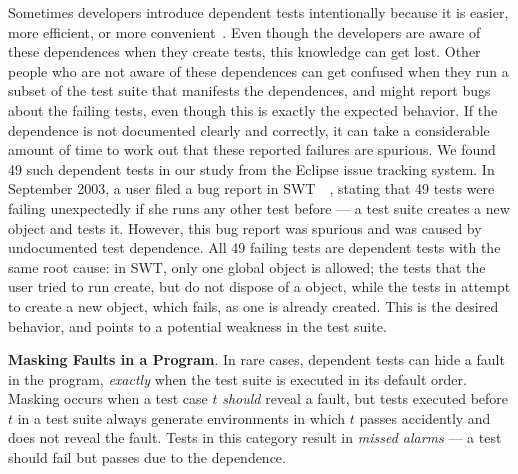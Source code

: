 Sometimes developers introduce dependent tests intentionally because it is
easier, more efficient, or more convenient~\cite{kapfhammeretal:FSE:2003, whittakeretal:2012}.
Even though the developers are aware of these dependences
when they create tests, this knowledge can get lost.
Other people who are not aware of these dependences can get confused 
when they run a subset of the test suite that manifests the
dependences, and might report bugs about the failing tests,
even though this is exactly the expected behavior. 
If the dependence is not documented clearly and
correctly, it can take a considerable amount of time to work out that
these reported failures are spurious. We found
49 such dependent tests in our study from the Eclipse issue tracking system.
In September 2003, a user filed a
bug report in SWT~\cite{swt}~\cite{eclipsebug},
stating that 49 tests were failing unexpectedly
if she runs any other test before  --- 
a test suite creates a new  object and tests it.
However, this bug report was spurious and was
caused by undocumented test dependence.
All 49 failing tests are dependent tests with the same
root cause: in SWT, only one global 
object is allowed; the tests that the user tried to run
create, but do not dispose of a  object, while
the tests in  attempt to create
a new  object, which fails, as one
is already created. This is the desired behavior,
and points to a potential weakness in the test suite.

\vspace{1mm}

\noindent \textbf{Masking Faults in a Program}. In rare cases,
dependent tests can hide a fault in the
program, \emph{exactly} when the test suite is executed in its default
order. Masking occurs when a test case $t$ \emph{should}
reveal a fault, but tests executed before $t$ in a test suite always
generate environments in which $t$ passes accidently and
does not reveal the fault. 
Tests in this category result in \textit{missed alarms} ---
a test should fail but passes due to the dependence.



